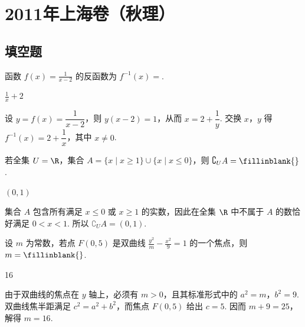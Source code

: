 \chapter{2011年上海卷（秋理）}

\section{填空题}

\begin{problem}
函数 \( f(x) = \frac{1}{x - 2} \) 的反函数为 \( f^{-1}(x) = \)\fillinblank{}.
\end{problem}

\begin{answer}
\(\frac{1}{x}+2\)
\end{answer}

\begin{solution}
设 \(y=f(x)=\dfrac{1}{x-2}\)，则 \(y(x-2)=1\)，从而 \(x=2+\dfrac{1}{y}\). 交换 \(x\)，\(y\) 得 \(f^{-1}(x)=2+\dfrac{1}{x}\)，其中 \(x\ne0\).
\end{solution}

\begin{problem}
若全集 \(U = \R\)，集合 \(A = \{x \mid x \geqslant 1\} \cup \{x \mid x \leqslant 0\}\)，则 \(\complement_U A =\fillinblank{}\).
\end{problem}

\begin{answer}
\((0,1)\)
\end{answer}

\begin{solution}
集合 \(A\) 包含所有满足 \(x\leqslant0\) 或 \(x\geqslant1\) 的实数，因此在全集 \(\R\) 中不属于 \(A\) 的数恰好满足 \(0<x<1\). 所以 \(\complement_U A=(0,1)\).
\end{solution}

\begin{problem}
设 \(m\) 为常数，若点 \(F(0,5)\) 是双曲线 \(\frac{y^2}{m} - \frac{x^2}{9} = 1\) 的一个焦点，则 \(m =\fillinblank{}\).
\end{problem}

\begin{answer}
16
\end{answer}

\begin{solution}
由于双曲线的焦点在 \(y\) 轴上，必须有 \(m>0\)，且其标准形式中的 \(a^2=m\)，\(b^2=9\). 双曲线焦半距满足 \(c^2=a^2+b^2\)，而焦点 \(F(0,5)\) 给出 \(c=5\). 因而 \(m+9=25\)，解得 \(m=16\).
\end{solution}

